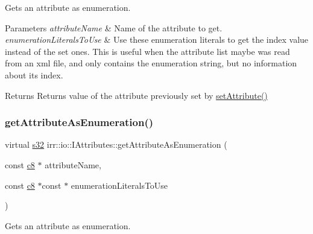 Gets an attribute as enumeration. 


\begin{DoxyParams}{Parameters}
{\em attribute\+Name} & Name of the attribute to get. \\
\hline
{\em enumeration\+Literals\+To\+Use} & Use these enumeration literals to get the index value instead of the set ones. This is useful when the attribute list maybe was read from an xml file, and only contains the enumeration string, but no information about its index. \\
\hline
\end{DoxyParams}
\begin{DoxyReturn}{Returns}
Returns value of the attribute previously set by \hyperlink{classirr_1_1io_1_1IAttributes_a03fa31acb481ae23678676cc183f09a6}{set\+Attribute()} 
\end{DoxyReturn}
\mbox{\label{classirr_1_1io_1_1IAttributes_a77c6a5fba661a85701986382df7d13b3}} 
\subsubsection{\texorpdfstring{get\+Attribute\+As\+Enumeration()}{getAttributeAsEnumeration()}\hspace{0.1cm}{\footnotesize\ttfamily [4/8]}}
{\footnotesize\ttfamily virtual \hyperlink{namespaceirr_ac66849b7a6ed16e30ebede579f9b47c6}{s32} irr\+::io\+::\+I\+Attributes\+::get\+Attribute\+As\+Enumeration (\begin{DoxyParamCaption}\item[{const \hyperlink{namespaceirr_a9395eaea339bcb546b319e9c96bf7410}{c8} $\ast$}]{attribute\+Name,  }\item[{const \hyperlink{namespaceirr_a9395eaea339bcb546b319e9c96bf7410}{c8} $\ast$const $\ast$}]{enumeration\+Literals\+To\+Use }\end{DoxyParamCaption})\hspace{0.3cm}{\ttfamily [pure virtual]}}



Gets an attribute as enumeration. 



